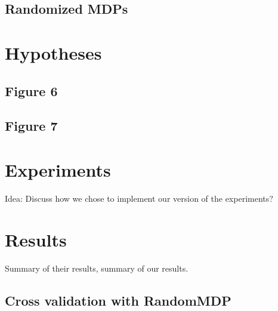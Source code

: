 \documentclass[11pt]{article} %
\begin{document}
\subsection{Randomized MDPs}



\section{Hypotheses}

\subsection{Figure 6}

\subsection{Figure 7}


\section{Experiments}

Idea: Discuss how we chose to implement our version of the experiments?



\section{Results}

Summary of their results, summary of our results.

\subsection{Cross validation with RandomMDP}
\end{document}

